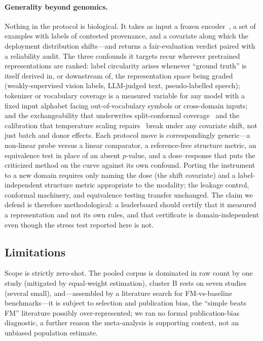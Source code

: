 \documentclass[11pt]{article}
\begin{document}
\paragraph{Generality beyond genomics.} Nothing in the protocol is biological. It takes as input a frozen encoder~\cite{bommasani2021,vaswani2017}, a set of examples with labels of contested provenance, and a covariate along which the deployment distribution shifts---and returns a fair-evaluation verdict paired with a reliability audit. The three confounds it targets recur wherever pretrained representations are ranked: label circularity arises whenever ``ground truth'' is itself derived in, or downstream of, the representation space being graded (weakly-supervised vision labels, LLM-judged text, pseudo-labelled speech); tokenizer or vocabulary coverage is a measured variable for any model with a fixed input alphabet facing out-of-vocabulary symbols or cross-domain inputs; and the exchangeability that underwrites split-conformal coverage~\cite{vovk2005,angelopoulos2023,barber2023} and the calibration that temperature scaling repairs~\cite{guo2017} break under any covariate shift, not just batch and donor effects. Each protocol move is correspondingly generic---a non-linear probe versus a linear comparator, a reference-free structure metric, an equivalence test in place of an absent $p$-value, and a dose--response that puts the criticized method on the curve against its own confound. Porting the instrument to a new domain requires only naming the dose (the shift covariate) and a label-independent structure metric appropriate to the modality; the leakage control, conformal machinery, and equivalence testing transfer unchanged. The claim we defend is therefore methodological: a leaderboard should certify that it measured a representation and not its own rules, and that certificate is domain-independent even though the stress test reported here is not.

\subsection*{Limitations}
Scope is strictly zero-shot. The pooled corpus is dominated in raw count by one study (mitigated by equal-weight estimation), cluster B rests on seven studies (several small), and---assembled by a literature search for FM-vs-baseline benchmarks---it is subject to selection and publication bias, the ``simple beats FM'' literature possibly over-represented; we ran no formal publication-bias diagnostic, a further reason the meta-analysis is supporting context, not an unbiased population estimate.
\end{document}
